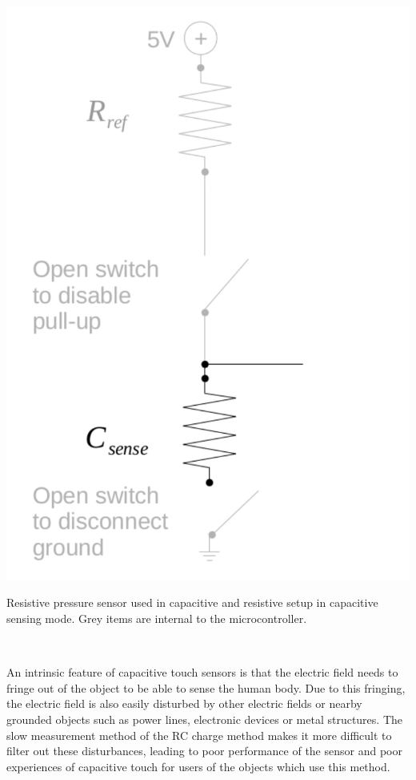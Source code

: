 \documentclass{sigchi-ext}
\begin{document}
\begin{marginfigure}
\begin{minipage}{\marginparwidth}
\centering
\includegraphics[width=0.9\columnwidth]{figures/cap_res_setup_cap}
\caption{Resistive pressure sensor used in capacitive and resistive setup in
capacitive sensing mode. Grey items are internal to the
microcontroller.}~\label{fig:cap_res_setup_cap}
\end{minipage}
\end{marginfigure}

An intrinsic feature of capacitive touch sensors is that the
electric field needs to fringe out of the object to be able to sense the human
body. Due to this fringing, the electric field is also easily disturbed by
other electric fields or nearby grounded objects such as power lines,
electronic devices or metal structures. The slow measurement method of the RC charge
method makes it more difficult to filter out these disturbances, leading to poor
performance of the sensor and poor experiences of capacitive touch for users of
the objects which use this method.
\end{document}
